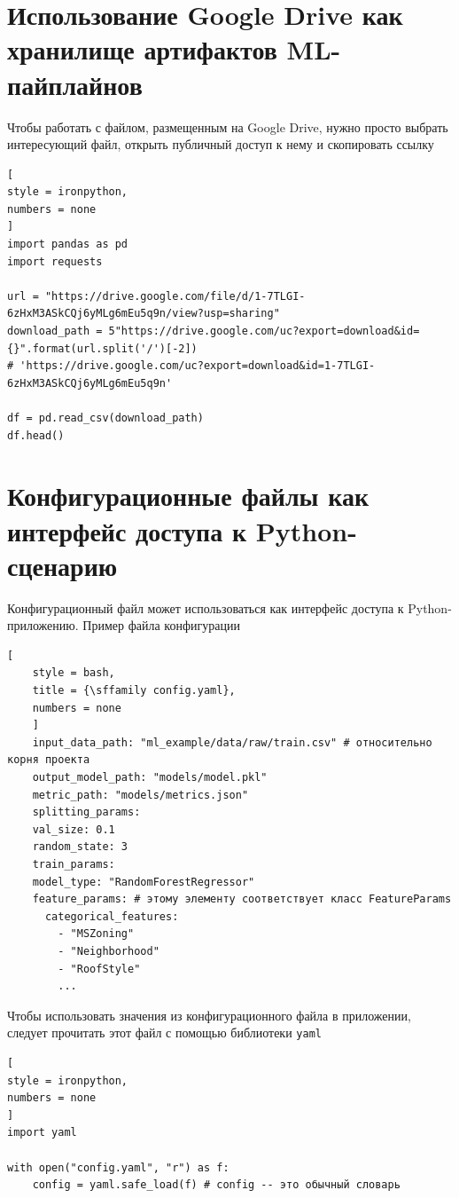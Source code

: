 \documentclass[%
	11pt,
	a4paper,
	utf8,
		]{article}
\begin{document}
\section{Использование Google Drive как хранилище артифактов ML-пайплайнов}

Чтобы работать с файлом, размещенным на Google Drive, нужно просто выбрать интересующий файл, открыть публичный доступ к нему  и скопировать ссылку
\begin{lstlisting}[
style = ironpython,
numbers = none	
]
import pandas as pd
import requests

url = "https://drive.google.com/file/d/1-7TLGI-6zHxM3ASkCQj6yMLg6mEu5q9n/view?usp=sharing"
download_path = 5"https://drive.google.com/uc?export=download&id={}".format(url.split('/')[-2])
# 'https://drive.google.com/uc?export=download&id=1-7TLGI-6zHxM3ASkCQj6yMLg6mEu5q9n'

df = pd.read_csv(download_path)
df.head()
\end{lstlisting}


\section{Конфигурационные файлы как интерфейс доступа к Python-сценарию}

Конфигурационный файл может использоваться как интерфейс доступа к Python-приложению. Пример файла конфигурации
\begin{lstlisting}[
	style = bash,
	title = {\sffamily config.yaml},
	numbers = none	
	]
	input_data_path: "ml_example/data/raw/train.csv" # относительно корня проекта
	output_model_path: "models/model.pkl"
	metric_path: "models/metrics.json"
	splitting_params:
	val_size: 0.1
	random_state: 3
	train_params:
	model_type: "RandomForestRegressor"
	feature_params: # этому элементу соответствует класс FeatureParams
	  categorical_features:
  	    - "MSZoning"
	    - "Neighborhood"
	    - "RoofStyle"
	    ...
\end{lstlisting}

Чтобы использовать значения из конфигурационного файла в приложении, следует прочитать этот файл с помощью библиотеки \texttt{yaml}
\begin{lstlisting}[
style = ironpython,
numbers = none	
]
import yaml
	
with open("config.yaml", "r") as f:
	config = yaml.safe_load(f) # config -- это обычный словарь
\end{lstlisting}
\end{document}
